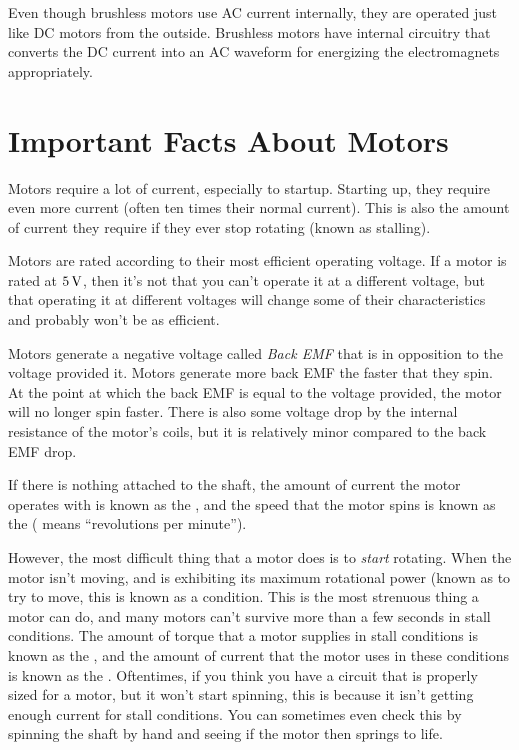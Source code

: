 Even though brushless motors use AC current internally, they are operated just like DC motors from the outside.
Brushless motors have internal circuitry that converts the DC current into an AC waveform for energizing the electromagnets appropriately.

\section{Important Facts About Motors}

Motors require a lot of current, especially to startup.
Starting up, they require even more current (often ten times their normal current).
This is also the amount of current they require if they ever stop rotating (known as stalling).

Motors are rated according to their most efficient operating voltage.
If a motor is rated at $5\,\si{\volt}$, then it's not that you can't operate it at a different voltage, but that operating it at different voltages will change some of their characteristics and probably won't be as efficient.

Motors generate a negative voltage called \emph{Back EMF} that is in opposition to the voltage provided it.
Motors generate more back EMF the faster that they spin.
At the point at which the back EMF is equal to the voltage provided, the motor will no longer spin faster.
There is also some voltage drop by the internal resistance of the motor's coils, but it is relatively minor compared to the back EMF drop.

If there is nothing attached to the shaft, the amount of current the motor operates with is known as the , and the speed that the motor spins is known as the  ( means ``revolutions per minute'').

However, the most difficult thing that a motor does is to \emph{start} rotating.
When the motor isn't moving, and is exhibiting its maximum rotational power (known as  to try to move, this is known as a  condition.
This is the most strenuous thing a motor can do, and many motors can't survive more than a few seconds in stall conditions.
The amount of torque that a motor supplies in stall conditions is known as the , and the amount of current that the motor uses in these conditions is known as the .
Oftentimes, if you think you have a circuit that is properly sized for a motor, but it won't start spinning, this is because it isn't getting enough current for stall conditions.
You can sometimes even check this by spinning the shaft by hand and seeing if the motor then springs to life.

